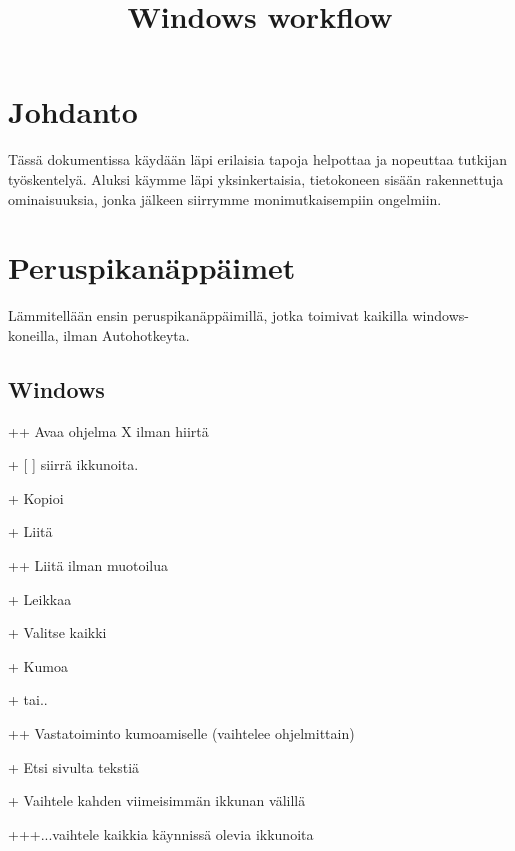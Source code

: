\documentclass[a4paper,12pt]{scrartcl}
\title{Windows workflow}
\begin{document}
\maketitle

\tableofcontents

\newpage

\section{Johdanto}\label{Johdanto}
Tässä dokumentissa käydään läpi erilaisia tapoja helpottaa ja nopeuttaa tutkijan työskentelyä. Aluksi käymme läpi yksinkertaisia, tietokoneen sisään rakennettuja ominaisuuksia, jonka jälkeen siirrymme monimutkaisempiin ongelmiin.

\section{Peruspikanäppäimet}
\label{perus}

Lämmitellään ensin peruspikanäppäimillä, jotka toimivat kaikilla windows-koneilla, ilman Autohotkeyta.

\subsection{Windows}

++\keys{\return} Avaa ohjelma X ilman hiirtä

+ [ \keys{\arrowkeyleft} \keys{\arrowkeyright} \keys{\arrowkeyup} \keys{\arrowkeydown} ] siirrä ikkunoita. 


+ Kopioi 

+ Liitä 

+\keys{\shift}+ Liitä ilman muotoilua

+ Leikkaa 

+ Valitse kaikki

+ Kumoa

+ tai..

+\keys{\shift}+  Vastatoiminto kumoamiselle (vaihtelee ohjelmittain)

+ Etsi sivulta tekstiä

+ Vaihtele kahden viimeisimmän ikkunan välillä

+++...vaihtele kaikkia käynnissä olevia ikkunoita
\end{document}

